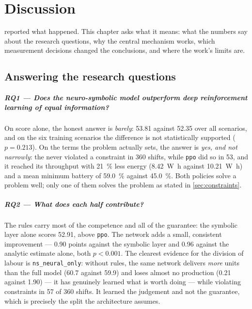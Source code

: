 \chapter{Discussion}
\label{ch:discussion}

 reported what happened. This chapter asks what it means: what the numbers say
about the research questions, why the central mechanism works, which measurement decisions changed
the conclusions, and where the work's limits are.

\section{Answering the research questions}
\label{sec:answers}

\paragraph{RQ1 --- Does the neuro-symbolic model outperform deep reinforcement learning of equal
information?}
On score alone, the honest answer is \emph{barely}: \num{53.81} against \num{52.35} over all
scenarios, and on the six training scenarios the difference is not statistically supported
($p=0.213$). On the terms the problem actually sets, the answer is \emph{yes, and not narrowly}:
the \NS never violated a constraint in \num{360} shifts, while \texttt{ppo} did so in \num{53}, and
it reached its throughput with \SI{21}{\percent} less energy (\SI{8.42}{\watt\hour} against
\SI{10.21}{\watt\hour}) and a mean minimum battery of \SI{59.0}{\percent} against
\SI{45.0}{\percent}. Both policies solve a problem well; only one of them solves the problem as
stated in \cref{sec:constraints}.

\paragraph{RQ2 --- What does each half contribute?}
The rules carry most of the competence and all of the guarantee: the symbolic layer alone scores
\num{52.91}, above \texttt{ppo}. The network adds a small, consistent improvement --- \num{0.90}
points against the symbolic layer and \num{0.96} against the analytic estimate alone, both
$p<0.001$. The clearest evidence for the division of labour is \texttt{ns\_neural\_only}: without
rules, the same network delivers \emph{more} units than the full model (\num{60.7} against
\num{59.9}) and loses almost no production (\num{0.21} against \num{1.90}) --- it has genuinely
learned what is worth doing --- while violating constraints in \num{57} of \num{360} shifts. It
learned the judgement and not the guarantee, which is precisely the split the architecture assumes.

